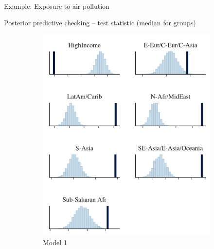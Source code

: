 \documentclass[t]{beamer}
\begin{document}
\begin{frame}{Example: Exposure to air pollution}


  Posterior predictive checking -- test statistic (median for groups)

  \begin{figure}
\centering
\begin{subfigure}{.31\textwidth}
\includegraphics[width=\textwidth]{ppc_med_grouped1.png}
\caption{Model 1}
\end{subfigure}
~
\begin{subfigure}{.31\textwidth}

\end{subfigure}
\end{figure}
\end{frame}
\end{document}

